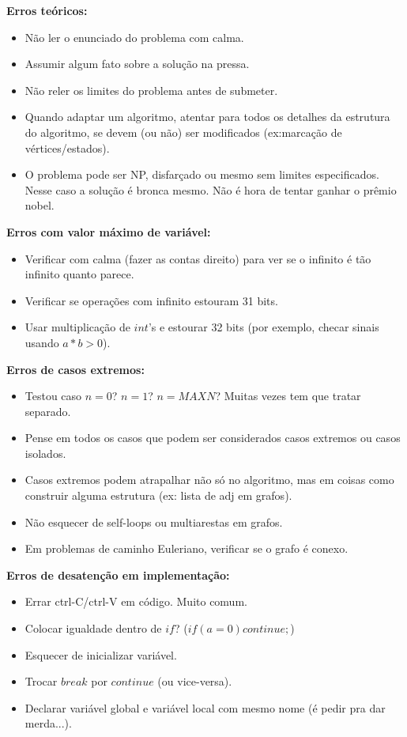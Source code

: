 \begin{multicols}{2}

\textbf{Erros teóricos:}
\begin{itemize}
\itemsep0em
\item Não ler o enunciado do problema com calma.
\item Assumir algum fato sobre a solução na pressa.
\item Não reler os limites do problema antes de submeter.
\item Quando adaptar um algoritmo, atentar para todos os detalhes da estrutura do algoritmo, se devem (ou não) ser modificados (ex:marcação de vértices/estados).
\item O problema pode ser NP, disfarçado ou mesmo sem limites especificados. Nesse caso a solução é bronca mesmo. Não é hora de tentar ganhar o prêmio nobel.
\end{itemize}

\textbf{Erros com valor máximo de variável:}
\begin{itemize}
\itemsep0em
\item Verificar com calma (fazer as contas direito) para ver se o infinito é tão infinito quanto parece. 
\item Verificar se operações com infinito estouram 31 bits.
\item Usar multiplicação de $int$'s e estourar 32 bits (por exemplo, checar sinais usando $a*b > 0$).
\end{itemize}

\textbf{Erros de casos extremos:}
\begin{itemize}
\itemsep0em
\item Testou caso $n=0$? $n=1$? $n=MAXN$? Muitas vezes tem que tratar separado.
\item Pense em todos os casos que podem ser considerados casos extremos ou casos isolados.
\item Casos extremos podem atrapalhar não só no algoritmo, mas em coisas como construir alguma estrutura (ex: lista de adj em grafos).
\item Não esquecer de self-loops ou multiarestas em grafos.
\item Em problemas de caminho Euleriano, verificar se o grafo é conexo.
\end{itemize}

\textbf{Erros de desatenção em implementação:}
\begin{itemize}
\itemsep0em
\item Errar ctrl-C/ctrl-V em código. Muito comum.
\item Colocar igualdade dentro de $if$? ($if(a = 0) continue;$)
\item Esquecer de inicializar variável.
\item Trocar $break$ por $continue$ (ou vice-versa).
\item Declarar variável global e variável local com mesmo nome (é pedir pra dar merda...).
\end{itemize}


\end{multicols}
